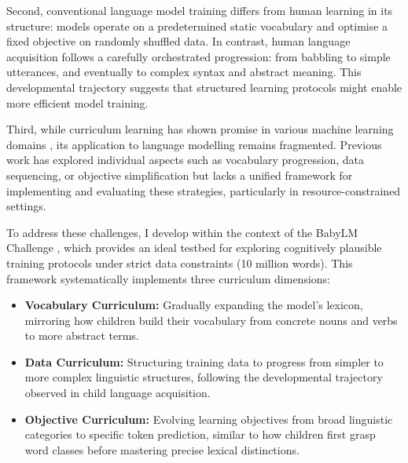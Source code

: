 Second, conventional language model training differs from human learning in its structure: models operate on a predetermined static vocabulary and optimise a fixed objective on randomly shuffled data. In contrast, human language acquisition follows a carefully orchestrated progression: from babbling to simple utterances, and eventually to complex syntax and abstract meaning. This developmental trajectory suggests that structured learning protocols might enable more efficient model training.

Third, while curriculum learning has shown promise in various machine learning domains \citep{bengio2009curriculum}, its application to language modelling remains fragmented. Previous work has explored individual aspects such as vocabulary progression, data sequencing, or objective simplification but lacks a unified framework for implementing and evaluating these strategies, particularly in resource-constrained settings.

To address these challenges, I develop \climb within the context of the BabyLM Challenge \citep{warstadt2023babylm1}, which provides an ideal testbed for exploring cognitively plausible training protocols under strict data constraints (10 million words). This framework systematically implements three curriculum dimensions:

\begin{itemize}
    \item \textbf{Vocabulary Curriculum:} Gradually expanding the model's lexicon, mirroring how children build their vocabulary from concrete nouns and verbs to more abstract terms.
    \item \textbf{Data Curriculum:} Structuring training data to progress from simpler to more complex linguistic structures, following the developmental trajectory observed in child language acquisition.
    \item \textbf{Objective Curriculum:} Evolving learning objectives from broad linguistic categories to specific token prediction, similar to how children first grasp word classes before mastering precise lexical distinctions.
\end{itemize}




    
